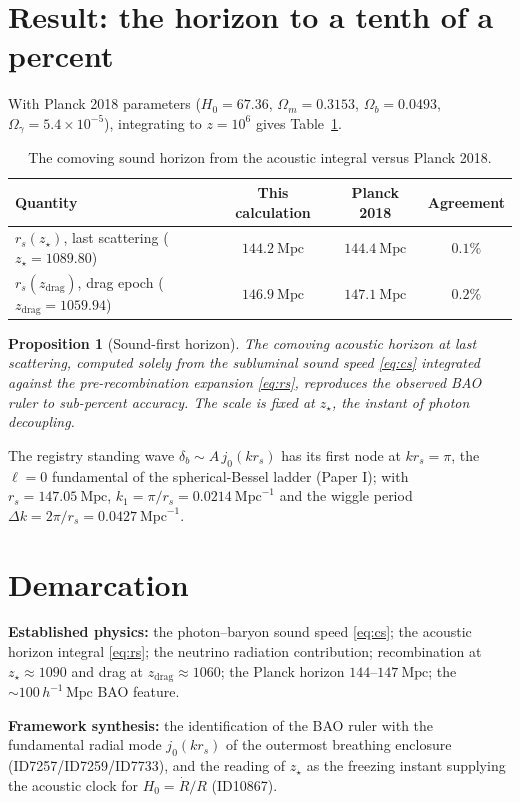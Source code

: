 \documentclass[11pt]{article}
\newtheorem{proposition}[theorem]{Proposition}
\theoremstyle{remark}
\newcommand{\Mpc}{\mathrm{Mpc}}
\begin{document}
\section{Result: the horizon to a tenth of a percent}
With Planck 2018 parameters ($H_0 = 67.36$, $\Omega_m = 0.3153$, $\Omega_b = 0.0493$, $\Omega_\gamma = 5.4\times10^{-5}$), integrating to $z = 10^6$ gives Table~\ref{tab:rs}.
\begin{table}[ht]\centering
\caption{The comoving sound horizon from the acoustic integral versus Planck 2018.}
\label{tab:rs}
\begin{tabular}{lccc}
\toprule
Quantity & This calculation & Planck 2018 & Agreement \\
\midrule
$r_s(z_\star)$, last scattering ($z_\star = 1089.80$) & $144.2\ \Mpc$ & $144.4\ \Mpc$ & $0.1\%$ \\
$r_s(z_{\mathrm{drag}})$, drag epoch ($z_{\mathrm{drag}} = 1059.94$) & $146.9\ \Mpc$ & $147.1\ \Mpc$ & $0.2\%$ \\
\bottomrule
\end{tabular}
\end{table}
\begin{proposition}[Sound-first horizon]
The comoving acoustic horizon at last scattering, computed solely from the subluminal sound speed \eqref{eq:cs} integrated against the pre-recombination expansion \eqref{eq:rs}, reproduces the observed BAO ruler to sub-percent accuracy. The scale is fixed at $z_\star$, the instant of photon decoupling.
\end{proposition}
The registry standing wave $\delta_b \sim A\,j_0(k r_s)$ has its first node at $k r_s = \pi$, the $\ell=0$ fundamental of the spherical-Bessel ladder (Paper I); with $r_s = 147.05\ \Mpc$, $k_1 = \pi/r_s = 0.0214\ \Mpc^{-1}$ and the wiggle period $\Delta k = 2\pi/r_s = 0.0427\ \Mpc^{-1}$.
\section{Demarcation}
\textbf{Established physics:} the photon--baryon sound speed \eqref{eq:cs}; the acoustic horizon integral \eqref{eq:rs}; the neutrino radiation contribution; recombination at $z_\star\approx1090$ and drag at $z_{\mathrm{drag}}\approx1060$; the Planck horizon $144$--$147\ \Mpc$; the $\sim 100\,h^{-1}\,\Mpc$ BAO feature.

\textbf{Framework synthesis:} the identification of the BAO ruler with the fundamental radial mode $j_0(k r_s)$ of the outermost breathing enclosure (ID7257/ID7259/ID7733), and the reading of $z_\star$ as the freezing instant supplying the acoustic clock for $H_0=\dot R/R$ (ID10867).
\end{document}
